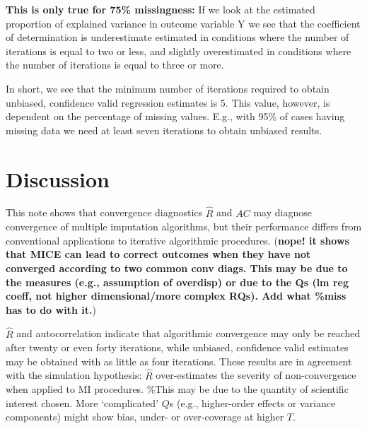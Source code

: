 \documentclass[Royal,times,sageh]{sagej}
\begin{document}
\textbf{This is only true for 75\% missingness:} If we look at the
estimated proportion of explained variance in outcome variable Y we see
that the coefficient of determination is underestimate estimated in
conditions where the number of iterations is equal to two or less, and
slightly overestimated in conditions where the number of iterations is
equal to three or more.

In short, we see that the minimum number of iterations required to
obtain unbiased, confidence valid regression estimates is 5. This value,
however, is dependent on the percentage of missing values. E.g., with
95\% of cases having missing data we need at least seven iterations to
obtain unbiased results.

\hypertarget{discussion}{%
\section{Discussion}\label{discussion}}

This note shows that convergence diagnostics \(\widehat{R}\) and \(AC\)
may diagnose convergence of multiple imputation algorithms, but their
performance differs from conventional applications to iterative
algorithmic procedures. (\textbf{nope! it shows that MICE can lead to
correct outcomes when they have not converged according to two common
conv diags. This may be due to the measures (e.g., assumption of
overdisp) or due to the Qs (lm reg coeff, not higher dimensional/more
complex RQs). Add what \%miss has to do with it.})

\(\widehat{R}\) and autocorrelation indicate that algorithmic
convergence may only be reached after twenty or even forty iterations,
while unbiased, confidence valid estimates may be obtained with as
little as four iterations. These results are in agreement with the
simulation hypothesis: \(\widehat{R}\) over-estimates the severity of
non-convergence when applied to MI procedures. \%This may be due to the
quantity of scientific interest chosen. More `complicated' \(Q\)s (e.g.,
higher-order effects or variance components) might show bias, under- or
over-coverage at higher \(T\).
\end{document}
